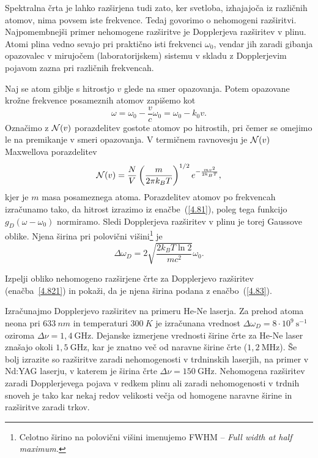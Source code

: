 Spektralna črta je lahko razširjena tudi zato, ker svetloba, izhajajoča iz različnih
atomov, nima povsem iste frekvence. Tedaj govorimo o nehomogeni 
razširitvi.
Najpomembnejši primer nehomogene razširitve je Dopplerjeva 
 razširitev v plinu. 
Atomi plina vedno sevajo pri praktično isti frekvenci $\omega_0$, vendar jih zaradi gibanja
opazovalec v mirujočem (laboratorijskem) sistemu v skladu z Dopplerjevim pojavom 
zazna pri različnih frekvencah. 

Naj se atom giblje s hitrostjo $v$ glede na smer opazovanja. Potem opazovane krožne 
frekvence posameznih atomov zapišemo kot  
\begin{equation}
\omega=\omega_{0}-\frac{v}{c}\omega_{0}=\omega_{0}-k_{0}v.
\label{4.81}
\end{equation}
Označimo z ${\cal N}(v)$ porazdelitev gostote atomov po hitrostih, pri čemer se omejimo 
le na premikanje v smeri opazovanja. V termičnem ravnovesju je ${\cal N}(v)$
Maxwellova porazdelitev
\begin{equation}
{\cal N}(v)=\frac{N}{V}\left(\frac{m}{2\pi k_{B}T}\right)^{1/2}e^{-\frac{mv^{2}}{2k_{B}T}},
\label{4.82}
\end{equation}
kjer je $m$ masa posameznega atoma.
Porazdelitev atomov po frekvencah izračunamo tako, da hitrost izrazimo
iz enačbe~(\ref{4.81}), poleg tega funkcijo $g_{D}(\omega-\omega_0)$
normiramo. Sledi
Dopplerjeva razširitev v plinu je torej Gaussove oblike.
Njena širina pri polovični 
višini\footnote{Celotno širino na polovični višini imenujemo FWHM -- \it{Full width at half maximum}.} je
\begin{equation} 
\Delta\omega_{D}=2 \sqrt{\frac{2k_{B}T \ln 2}{mc^{2}}}\omega_{0}.
\label{4.83}
\end{equation}
\begin{definition}
Izpelji obliko nehomogeno razširjene črte za Dopplerjevo razširitev (enačba~\ref{4.821})
in pokaži, da je njena širina podana z enačbo~(\ref{4.83}).
\end{definition}

Izračunajmo Dopplerjevo razširitev na primeru He-Ne laserja. Za prehod
atoma neona pri $633~\si{nm}$ in temperaturi $300~\si{K}$ je izračunana vrednost
$\Delta\omega_{D}=8\cdot10^{9}~\si{\second}^{-1}$ oziroma $\Delta \nu = 1,4~\si{\giga\hertz}$. 
Dejanske izmerjene vrednosti širine črte za He-Ne laser 
znašajo okoli $1,5~\si{\giga\hertz}$, kar je znatno več od naravne širine
črte ($1,2~\si{\mega\hertz}$). Še bolj izrazite so razširitve zaradi nehomogenosti
v trdninskih laserjih, na primer v Nd:YAG laserju, v katerem 
je širina črte $\Delta \nu= 150~\si{\giga\hertz}$. Nehomogena razširitev zaradi Dopplerjevega pojava v 
redkem plinu ali zaradi nehomogenosti v trdnih snoveh je tako kar nekaj redov velikosti 
večja od homogene naravne širine in razširitve zaradi trkov.


